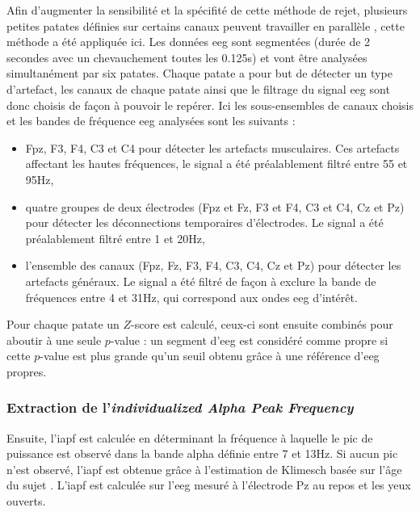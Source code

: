 Afin d'augmenter la sensibilité et la spécifité de cette méthode de rejet, plusieurs petites patates définies sur certains canaux peuvent travailler en parallèle \citet{Barthelemy2019}, 
cette méthode a été appliquée ici.
Les données \gls{eeg} sont segmentées (durée de 2 secondes avec un chevauchement toutes les 0.125s) et vont être analysées simultanément par six patates. Chaque patate a pour but de détecter 
un type d'artefact, les canaux de chaque patate ainsi que le filtrage du signal \gls{eeg} sont donc choisis de façon à pouvoir le repérer. 
Ici les sous-ensembles de canaux choisis et les bandes de fréquence \gls{eeg} analysées sont les suivants :
\begin{itemize}
\item Fpz, F3, F4, C3 et C4 pour détecter les artefacts musculaires. Ces artefacts affectant les hautes fréquences, le signal a été préalablement filtré entre 55 et 95Hz,
\item quatre groupes de deux électrodes (Fpz et Fz, F3 et F4, C3 et C4, Cz et Pz) pour détecter les déconnections temporaires d'électrodes. Le signal a été préalablement filtré entre 1 et 20Hz, 
\item l'ensemble des canaux (Fpz, Fz, F3, F4, C3, C4, Cz et Pz) pour détecter les artefacts généraux. Le signal a été filtré de façon à exclure la bande de fréquences entre 4 et 31Hz, qui correspond
aux ondes \gls{eeg} d'intérêt.
\end{itemize}
Pour chaque patate un $Z$-score est calculé, ceux-ci sont ensuite combinés pour aboutir à une seule $p$-value : un segment d'\gls{eeg} est considéré comme propre si cette $p$-value est 
plus grande qu'un seuil obtenu grâce à une référence d'\gls{eeg} propres. 

\subsubsection{Extraction de l'\textit{individualized Alpha Peak Frequency}} \label{extraction_iapf}
Ensuite, l'\gls{iapf} est calculée en déterminant la fréquence à laquelle le pic de puissance est observé dans la bande alpha définie entre 7 et 13Hz. Si aucun pic n'est observé,
l'\gls{iapf} est obtenue grâce à l'estimation de Klimesch basée sur l'âge du sujet \citep{Klimesch1999}. L'\gls{iapf} est calculée sur l'\gls{eeg} mesuré à l'électrode Pz au repos
et les yeux ouverts. 


